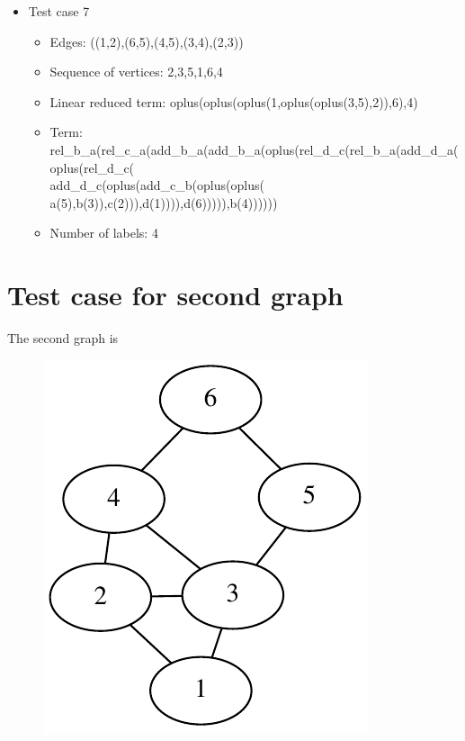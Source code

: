 \documentclass[a4paper, 12pt]{article}
\begin{document}
\begin{itemize}
\item Test case 7
	\begin{itemize}
		\item Edges: ((1,2),(6,5),(4,5),(3,4),(2,3))
		\item Sequence of vertices: 2,3,5,1,6,4
		\item Linear reduced term: oplus(oplus(oplus(1,oplus(oplus(3,5),2)),6),4)
		\item Term: rel\_b\_a(rel\_c\_a(add\_b\_a(add\_b\_a(oplus(rel\_d\_c(rel\_b\_a(add\_d\_a(oplus(rel\_d\_c( \\
add\_d\_c(oplus(add\_c\_b(oplus(oplus( a(5),b(3)),c(2))),d(1)))),d(6))))),b(4))))))
		\item Number of labels: 4
	\end{itemize}
\end{itemize}

\section{Test case for second graph}
The second graph is

\begin{figure}[H]
\centering{}
\includegraphics{image/graph2_example2}
\end{figure}
\end{document}
